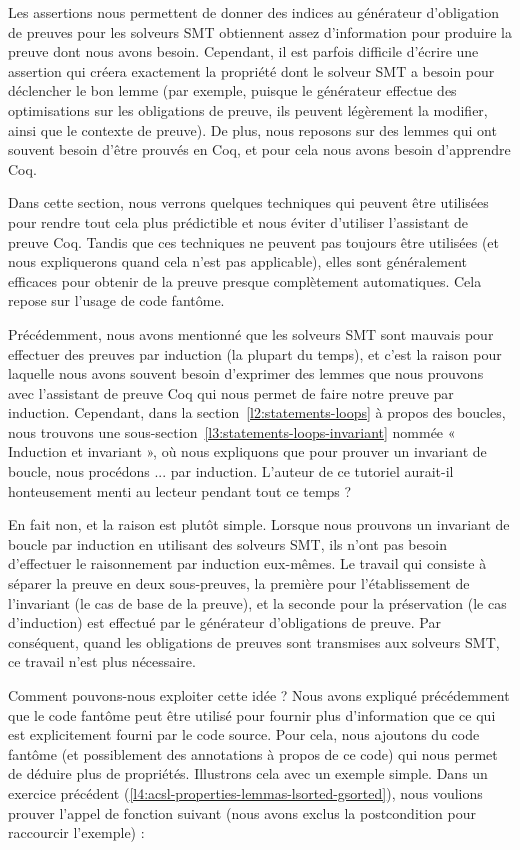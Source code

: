 Les assertions nous permettent de donner des indices au générateur
d'obligation de preuves pour les solveurs SMT obtiennent assez d'information
pour produire la preuve dont nous avons besoin. Cependant, il est parfois
difficile d'écrire une assertion qui créera exactement la propriété dont le
solveur SMT a besoin pour déclencher le bon lemme (par exemple, puisque le
générateur effectue des optimisations sur les obligations de preuve, ils peuvent
légèrement la modifier, ainsi que le contexte de preuve). De plus, nous
reposons sur des lemmes qui ont souvent besoin d'être prouvés en Coq, et pour
cela nous avons besoin d'apprendre Coq.


Dans cette section, nous verrons quelques techniques qui peuvent être
utilisées pour rendre tout cela plus prédictible et nous éviter d'utiliser
l'assistant de preuve Coq. Tandis que ces techniques ne peuvent pas toujours
être utilisées (et nous expliquerons quand cela n'est pas applicable), elles
sont généralement efficaces pour obtenir de la preuve presque complètement
automatiques. Cela repose sur l'usage de code fantôme.




Précédemment, nous avons mentionné que les solveurs SMT sont mauvais pour
effectuer des preuves par induction (la plupart du temps), et c'est la raison
pour laquelle nous avons souvent besoin d'exprimer des lemmes que nous prouvons
avec l'assistant de preuve Coq qui nous permet de faire notre preuve par
induction. Cependant, dans la section~\ref{l2:statements-loops} à propos des
boucles, nous trouvons une sous-section~\ref{l3:statements-loops-invariant}
nommée « Induction et invariant », où nous expliquons que pour prouver un
invariant de boucle, nous procédons ... par induction. L'auteur de ce tutoriel
aurait-il honteusement menti au lecteur pendant tout ce temps ?


En fait non, et la raison est plutôt simple. Lorsque nous prouvons un
invariant de boucle par induction en utilisant des solveurs SMT, ils n'ont pas
besoin d'effectuer le raisonnement par induction eux-mêmes. Le travail qui
consiste à séparer la preuve en deux sous-preuves, la première pour
l'établissement de l'invariant (le cas de base de la preuve), et la seconde pour
la préservation (le cas d'induction) est effectué par le générateur
d'obligations de preuve. Par conséquent, quand les obligations de preuves sont
transmises aux solveurs SMT, ce travail n'est plus nécessaire.


Comment pouvons-nous exploiter cette idée ? Nous avons expliqué précédemment
que le code fantôme peut être utilisé pour fournir plus d'information que ce qui
est explicitement fourni par le code source. Pour cela, nous ajoutons du code
fantôme (et possiblement des annotations à propos de ce code) qui nous permet
de déduire plus de propriétés. Illustrons cela avec un exemple simple. Dans
un exercice précédent (\ref{l4:acsl-properties-lemmas-lsorted-gsorted}), nous
voulions prouver l'appel de fonction suivant (nous avons exclus la
postcondition pour raccourcir l'exemple) :


